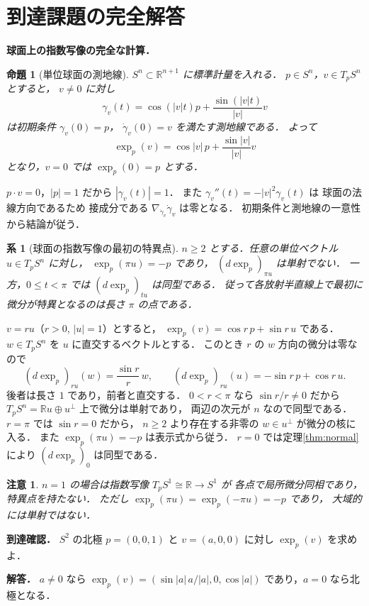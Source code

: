 \documentclass[a5paper,10pt,onecolumn]{jsarticle}
\makeatletter
\theoremstyle{mathnotetheorem}
\newtheorem{proposition}[theorem]{命題}
\newtheorem{corollary}[theorem]{系}
\newtheorem{remark}[theorem]{注意}
\renewcommand{\proofname}{証明}
\renewenvironment{proof}[1][\proofname]{%
  \par\pushQED{\qed}\normalfont\topsep4\p@\@plus2\p@\relax
  \trivlist\item[\hskip\labelsep\bfseries #1]\ignorespaces
}{\popQED\endtrivlist\@endpefalse}
\makeatother
\begin{document}
\section{到達課題の完全解答}
\noindent\textbf{球面上の指数写像の完全な計算．}
\begin{proposition}[単位球面の測地線]
$S^n\subset\mathbb R^{n+1}$ に標準計量を入れる．
$p\in S^n$，$v\in T_pS^n$ とすると，
$v\ne0$ に対し
\[
\gamma_v(t)=\cos(|v|t)p+
\frac{\sin(|v|t)}{|v|}v
\]
は初期条件 $\gamma_v(0)=p$，
$\dot\gamma_v(0)=v$ を満たす測地線である．
よって
\[
\exp_p(v)=\cos|v|\,p+
\frac{\sin|v|}{|v|}v
\]
となり，$v=0$ では $\exp_p(0)=p$ とする．
\end{proposition}
\begin{proof}
$p\cdot v=0$，$|p|=1$ だから
$|\gamma_v(t)|=1$．
また
$\gamma_v''(t)=-|v|^2\gamma_v(t)$ は
球面の法線方向であるため
接成分である
$\nabla_{\dot\gamma_v}\dot\gamma_v$ は零となる．
初期条件と測地線の一意性から結論が従う．
\end{proof}
\begin{corollary}[球面の指数写像の最初の特異点]
$n\ge2$ とする．任意の単位ベクトル $u\in T_pS^n$ に対し，
$\exp_p(\pi u)=-p$ であり，
$(d\exp_p)_{\pi u}$ は単射でない．
一方，$0\le t<\pi$ では $(d\exp_p)_{tu}$ は同型である．
従って各放射半直線上で最初に微分が特異となるのは長さ $\pi$ の点である．
\end{corollary}
\begin{proof}
$v=ru$（$r>0$, $|u|=1$）とすると，
$\exp_p(v)=\cos r\,p+\sin r\,u$ である．
$w\in T_pS^n$ を $u$ に直交するベクトルとする．
このとき $r$ の $w$ 方向の微分は零なので
\[
 (d\exp_p)_{ru}(w)=\frac{\sin r}{r}\,w,
 \qquad
 (d\exp_p)_{ru}(u)=-\sin r\,p+\cos r\,u.
\]
後者は長さ $1$ であり，前者と直交する．
$0<r<\pi$ なら $\sin r/r\ne0$ だから
$T_pS^n=\mathbb Ru\oplus u^\perp$ 上で微分は単射であり，
両辺の次元が $n$ なので同型である．
$r=\pi$ では $\sin r=0$ だから，
$n\ge2$ より存在する非零の $w\in u^\perp$ が微分の核に入る．
また $\exp_p(\pi u)=-p$ は表示式から従う．
$r=0$ では定理\ref{thm:normal}により
$(d\exp_p)_0$ は同型である．
\end{proof}
\begin{remark}
$n=1$ の場合は指数写像 $T_pS^1\cong\mathbb R\to S^1$ が
各点で局所微分同相であり，特異点を持たない．
ただし $\exp_p(\pi u)=\exp_p(-\pi u)=-p$ であり，
大域的には単射ではない．
\end{remark}
\noindent\textbf{到達確認．}
$S^2$ の北極 $p=(0,0,1)$ と
$v=(a,0,0)$ に対し $\exp_p(v)$ を求めよ．
\par\noindent\textbf{解答．}
$a\ne0$ なら
$\exp_p(v)=(\sin|a|\,a/|a|,0,\cos|a|)$
であり，$a=0$ なら北極となる．
\end{document}
